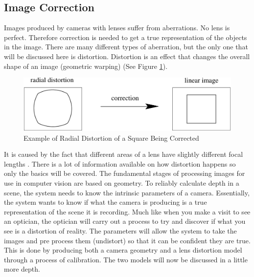 \documentclass[11pt,oneside]{report}
\begin{document}
				\subsection{Image Correction}
				Images produced by cameras with lenses suffer from aberrations.
				No lens is perfect.
				Therefore correction is needed to get a true representation of the objects in the image.
				There are many different types of aberration, but the only one that will be discussed here is distortion.
				Distortion is an effect that changes the overall shape of an image (geometric warping) (See Figure \ref{fig:distortion}).
				\begin{figure}
				\centering
					
    					\includegraphics[width=\textwidth]{distortion_1}
    					\caption{Example of Radial Distortion of a Square Being Corrected \protect\cite{book:multiViewGeo} {\label{fig:distortion}}}

				\end{figure}				
				It is caused by the fact that different areas of a lens have slightly different focal lengths \cite[p. 42]{book:modern}.
				There is a lot of information available on how distortion happens so only the basics will be covered. %
				The fundamental stages of processing images for use in computer vision are based on geometry.
				To reliably calculate depth in a scene, the system needs to know the intrinsic %
				parameters of a camera.
				Essentially, the system wants to know if what the camera is producing is a true representation of the scene it is recording.
				Much like when you make a visit to see an optician, the optician will carry out a process to try and discover if what you see is a distortion of reality.
				The parameters will allow the system to take the images and pre process them (undistort) so that it can be confident they are true.
				This is done by producing both a camera geometry and a lens distortion model through a process of calibration.  
				The two models will now be discussed in a little more depth.				
\end{document}

